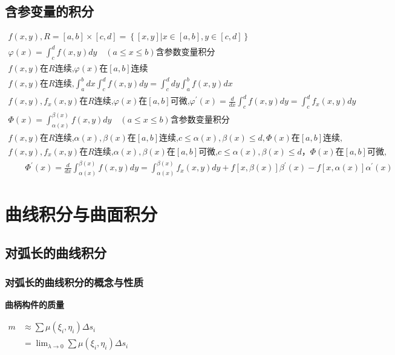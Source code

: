 \documentclass[UTF8]{ctexart}
\newcommand{\mt}[1]{\text{#1}}
\newcommand{\mb}[1]{\textbf{#1}}
\newcommand{\mf}[1]{\left( #1\right)}
\newcommand{\mfb}[1]{\left\{ #1\right\}}
\newcommand{\mfc}[1]{\left[ #1 \right]}
\newcommand{\q}{\quad}
\newcommand{\p}{\par}
\newcommand{\ma}[1]{\begin{array}{llll} #1 \end{array}}
\newcommand{\mseq}{\approx }
\begin{document}
\subsection{含参变量的积分}

$\ma{f\mf{x,y},R=\mfc{a,b}\times\mfc{c,d}=\mfb{\mfc{x,y}|x\in \mfc{a,b},y\in \mfc{c,d}}\\
    \varphi\mf{x}=\int_c^df\mf{x,y}dy \q \mf{a \leqslant x \leqslant b} \mb{含参数变量积分}\\
    f\mf{x,y}\mt{在}R\mt{连续,}\varphi\mf{x}\mt{在}\mfc{a,b}\mt{连续}\\
    f\mf{x,y}\mt{在}R\mt{连续,}\int_a^bdx\int_c^df\mf{x,y}dy=\int_c^ddy\int_a^bf\mf{x,y}dx\\
    f\mf{x,y},f_x\mf{x,y}\mt{在}R\mt{连续,}\varphi\mf{x}\mt{在}\mfc{a,b}\mt{可微,}\varphi^{'}\mf{x}=\frac{d}{dx}\int_c^df\mf{x,y}dy=\int_c^df_x\mf{x,y}dy\\
    \Phi\mf{x}=\int_{\alpha\mf{x}}^{\beta\mf{x}}f\mf{x,y}dy\q \mf{a \leqslant x \leqslant b} \mb{含参数变量积分}\\
    f\mf{x,y}\mt{在}R\mt{连续,}\alpha\mf{x},\beta\mf{x}\mt{在}\mfc{a,b}\mt{连续,}c\leqslant \alpha\mf{x},\beta\mf{x}\leqslant d,\Phi\mf{x}\mt{在}\mfc{a,b}\mt{连续,}\\
    f\mf{x,y},f_x\mf{x,y}\mt{在}R\mt{连续,}\alpha\mf{x},\beta\mf{x}\mt{在}\mfc{a,b}\mt{可微,}c\leqslant \alpha\mf{x},\beta\mf{x}\leqslant d，\Phi\mf{x}\mt{在}\mfc{a,b}\mt{可微,}\\
    \q \q \Phi^{'}\mf{x}=\frac{d}{dx}\int_{\alpha\mf{x}}^{\beta\mf{x}}f\mf{x,y}dy=\int_{\alpha\mf{x}}^{\beta\mf{x}}f_x\mf{x,y}dy+
    f\mfc{x,\beta\mf{x}}\beta^{'}\mf{x}-f\mfc{x,\alpha \mf{x}}\alpha^{'}\mf{x}
    }$



\section{曲线积分与曲面积分}

\subsection{对弧长的曲线积分}
\subsubsection{对弧长的曲线积分的概念与性质}
\mb{曲柄构件的质量}\p
$\ma{
    m  &\mseq \sum \mu\mf{\xi_i,\eta_i}\Delta s_i\\
     &=\lim_{\lambda \rightarrow 0}\sum \mu\mf{\xi_i,\eta_i}\Delta s_i
}$
\end{document}
